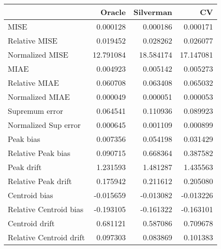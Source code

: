 \begin{tabular}{lrrr}
  \toprule
 & Oracle & Silverman & CV \\ 
  \midrule
MISE & 0.000128 & 0.000186 & 0.000171 \\ 
  Relative MISE & 0.019452 & 0.028262 & 0.026077 \\ 
  Normalized MISE & 12.791084 & 18.584174 & 17.147081 \\ 
  MIAE & 0.004923 & 0.005142 & 0.005273 \\ 
  Relative MIAE & 0.060708 & 0.063408 & 0.065032 \\ 
  Normalized MIAE & 0.000049 & 0.000051 & 0.000053 \\ 
  Supremum error & 0.064541 & 0.110936 & 0.089923 \\ 
  Normalized Sup error & 0.000645 & 0.001109 & 0.000899 \\ 
  Peak bias & 0.007356 & 0.054198 & 0.031429 \\ 
  Relative Peak bias & 0.090715 & 0.668364 & 0.387582 \\ 
  Peak drift & 1.231593 & 1.481287 & 1.435563 \\ 
  Relative Peak drift & 0.175942 & 0.211612 & 0.205080 \\ 
  Centroid bias & -0.015659 & -0.013082 & -0.013226 \\ 
  Relative Centroid bias & -0.193105 & -0.161322 & -0.163101 \\ 
  Centroid drift & 0.681121 & 0.587086 & 0.709678 \\ 
  Relative Centroid drift & 0.097303 & 0.083869 & 0.101383 \\ 
   \bottomrule
\end{tabular}
